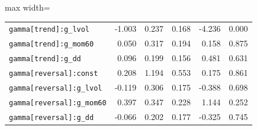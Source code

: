 \begin{table}[!htbp]
\begin{adjustbox}{max width=\textwidth}
\begin{tabular}{lrrrrr}
\texttt{gamma[trend]:g\_lvol} & -1.003 & 0.237 & 0.168 & -4.236 & 0.000\\
\texttt{gamma[trend]:g\_mom60} & 0.050 & 0.317 & 0.194 & 0.158 & 0.875\\
\texttt{gamma[trend]:g\_dd} & 0.096 & 0.199 & 0.156 & 0.481 & 0.631\\
\texttt{gamma[reversal]:const} & 0.208 & 1.194 & 0.553 & 0.175 & 0.861\\
\texttt{gamma[reversal]:g\_lvol} & -0.119 & 0.306 & 0.175 & -0.388 & 0.698\\
\texttt{gamma[reversal]:g\_mom60} & 0.397 & 0.347 & 0.228 & 1.144 & 0.252\\
\texttt{gamma[reversal]:g\_dd} & -0.066 & 0.202 & 0.177 & -0.325 & 0.745\\
\bottomrule
\end{tabular}
\end{adjustbox}
\end{table}